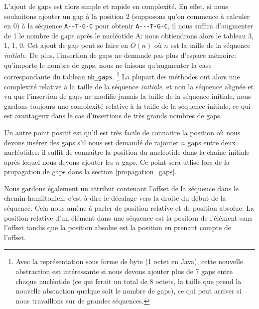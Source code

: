L'ajout de gaps est alors simple et rapide en complexité. En effet,
si nous souhaitons ajouter un gap à la position 2 (supposons qu'on commence à
calculer en 0) à la séquence \verb|A--T-G-C| pour obtenir \verb|A---T-G-C|, il
nous suffira d'augmenter de 1 le nombre de gaps après le nucléotide A: nous
obtiendrons alors le tableau {3, 1, 1, 0}. Cet ajout de gap peut se faire en
$O(n)$ où $n$ est la taille de la séquence \textit{initiale}. De plus,
l'insertion de gaps ne demande pas plus d'espace mémoire: qu'importe le nombre
de gaps, nous ne faisons qu'augmenter la case
correspondante du tableau \verb|nb_gaps|. \footnote{Avec la représentation sous
	forme de byte (1 octet en Java), cette nouvelle abstraction est intéressante
si nous devons ajouter plus de 7 gaps entre chaque nucléotide (ce qui ferait un
total de 8 octets, la taille que prend la nouvelle abstaction quelque soit le
nombre de gaps), ce qui peut
arriver si nous travaillons sur de grandes séquences.} La plupart des méthodes
ont alors une complexité relative à la taille de la
séquence \textit{initiale}, et non la séquence alignée et vu que l'insertion de
gaps ne modifie jamais la taille de la séquence initiale, nous
gardons toujours une complexité relative à la taille de la séquence initiale, ce
qui est avantageux dans le cas d'insertions de très grands nombres de gaps.

Un autre point positif est qu'il est très facile de connaitre la position où nous
devons insérer des gaps s'il nous est demandé de rajouter $n$ gaps entre deux
nucléotides: il suffit de connaitre la position du nucléotide dans la chaine
initiale après lequel nous devons ajouter les $n$ gaps. Ce point sera utlisé
lors de la propagation de gaps dans la section \ref{propagation_gaps}.

Nous gardons également un attribut contenant l'offset de la séquence dans le
chemin hamiltonien, c'est-à-dire le décalage vers la droite du début de la
séquence. Cela nous amène à parler de position relative et de position absolue.
La position relative d'un élément dans une séquence est la position de l'élément
sans l'offset tandis que la position absolue est la position en prenant compte
de l'offset.


